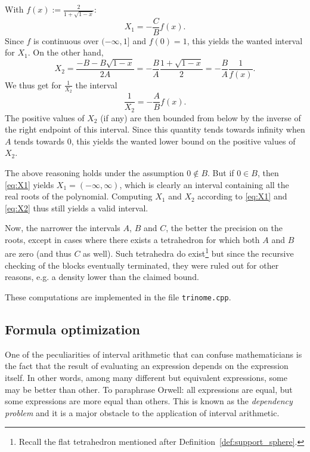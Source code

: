 \documentclass[11pt]{article}
\begin{document}
With $f(x):=\tfrac{2}{1+\sqrt{1-x}}$:
\begin{equation}
\label{eq:X1}
X_1=-\frac{C}{B}f(x).
\end{equation}
Since $f$ is continuous over $(-\infty,1]$ and $f(0)=1$, this yields the wanted interval for $X_1$.
On the other hand,
\[
X_2
=\frac{-B-B\sqrt{1-x}}{2A}
=-\frac{B}{A}\frac{1+\sqrt{1-x}}{2}
=-\frac{B}{A}\frac{1}{f(x)}.
\]
We thus get for $\tfrac{1}{X_2}$ the interval
\begin{equation}
\label{eq:X2}
\frac{1}{X_2}=-\frac{A}{B}f(x).
\end{equation}
The positive values of $X_2$ (if any) are then bounded from below by the inverse of the right endpoint of this interval.
Since this quantity tends towards infinity when $A$ tends towards $0$, this yields the wanted lower bound on the positive values of $X_2$.

The above reasoning holds under the assumption $0\notin B$.
But if $0\in B$, then \eqref{eq:X1} yields $X_1=(-\infty,\infty)$, which is clearly an interval containing all the real roots of the polynomial.
Computing $X_1$ and $X_2$ according to \eqref{eq:X1} and \eqref{eq:X2} thus still yields a valid interval.

Now, the narrower the intervals $A$, $B$ and $C$, the better the precision on the roots, except in cases where there exists a tetrahedron for which both $A$ and $B$ are zero (and thus $C$ as well).
Such tetrahedra do exist\footnote{Recall the flat tetrahedron mentioned after Definition~\ref{def:support_sphere}.} but since the recursive checking of the blocks eventually terminated, they were ruled out for other reasons, e.g. a density lower than the claimed bound.

These computations are implemented in the file \verb+trinome.cpp+.



\subsection{Formula optimization}
\label{sec:formulas_opt}

One of the peculiarities of interval arithmetic that can confuse mathematicians is the fact that the result of evaluating an expression depends on the expression itself.
In other words, among many different but equivalent expressions, some may be better than other.
To paraphrase Orwell: all expressions are equal, but some expressions are more equal than others.
This is known as the {\em dependency problem} and it is a major obstacle to the application of interval arithmetic. 
\end{document}
